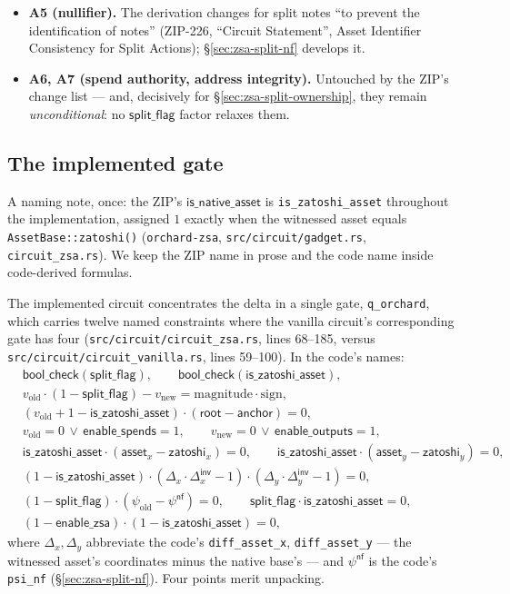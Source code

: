 \documentclass[11pt,a4paper]{article}
\theoremstyle{definition}
\newcommand{\nfsym}{\mathsf{nf}}
\begin{document}
\begin{itemize}[leftmargin=*]
\item \textbf{A5 (nullifier).} The derivation changes for split notes
``to prevent the identification of notes'' (ZIP-226, ``Circuit
Statement'', Asset Identifier Consistency for Split Actions);
\S\ref{sec:zsa-split-nf} develops it.

\item \textbf{A6, A7 (spend authority, address integrity).} Untouched by
the ZIP's change list --- and, decisively for
\S\ref{sec:zsa-split-ownership}, they remain \emph{unconditional}: no
$\mathsf{split\_flag}$ factor relaxes them.
\end{itemize}

\subsection{The implemented gate}\label{sec:zsa-split-gate}

A naming note, once: the ZIP's $\mathsf{is\_native\_asset}$ is
\texttt{is\_zatoshi\_asset} throughout the implementation, assigned $1$
exactly when the witnessed asset equals \texttt{AssetBase::zatoshi()}
(\texttt{orchard-zsa}, \texttt{src/circuit/gadget.rs},
\texttt{circuit\_zsa.rs}). We keep the ZIP name in prose and the code name
inside code-derived formulas.

The implemented circuit concentrates the delta in a single gate,
\texttt{q\_orchard}, which carries twelve named constraints
where the vanilla circuit's corresponding gate has four
(\texttt{src/circuit/circuit\_zsa.rs}, lines 68--185, versus
\texttt{src/circuit/circuit\_vanilla.rs}, lines 59--100). In the code's
names:
\begin{align*}
&\mathsf{bool\_check}(\mathsf{split\_flag}), \qquad
\mathsf{bool\_check}(\mathsf{is\_zatoshi\_asset}),\\
&v_{\mathrm{old}} \cdot (1 - \mathsf{split\_flag}) - v_{\mathrm{new}}
= \mathrm{magnitude} \cdot \mathrm{sign},\\
&(v_{\mathrm{old}} + 1 - \mathsf{is\_zatoshi\_asset}) \cdot
(\mathsf{root} - \mathsf{anchor}) = 0,\\
&v_{\mathrm{old}} = 0 \,\lor\, \mathsf{enable\_spends} = 1, \qquad
v_{\mathrm{new}} = 0 \,\lor\, \mathsf{enable\_outputs} = 1,\\
&\mathsf{is\_zatoshi\_asset} \cdot (\mathsf{asset}_x -
\mathsf{zatoshi}_x) = 0, \qquad
\mathsf{is\_zatoshi\_asset} \cdot (\mathsf{asset}_y -
\mathsf{zatoshi}_y) = 0,\\
&(1 - \mathsf{is\_zatoshi\_asset}) \cdot (\Delta_x \cdot
\Delta_x^{\mathsf{inv}} - 1) \cdot (\Delta_y \cdot
\Delta_y^{\mathsf{inv}} - 1) = 0,\\
&(1 - \mathsf{split\_flag}) \cdot (\psi_{\mathrm{old}} -
\psi^{\nfsym}) = 0, \qquad
\mathsf{split\_flag} \cdot \mathsf{is\_zatoshi\_asset} = 0,\\
&(1 - \mathsf{enable\_zsa}) \cdot (1 - \mathsf{is\_zatoshi\_asset}) = 0,
\end{align*}
where $\Delta_x, \Delta_y$ abbreviate the code's
\texttt{diff\_asset\_x}, \texttt{diff\_asset\_y} --- the witnessed asset's
coordinates minus the native base's --- and $\psi^{\nfsym}$ is the code's
\texttt{psi\_nf} (\S\ref{sec:zsa-split-nf}). Four points merit unpacking.
\end{document}
